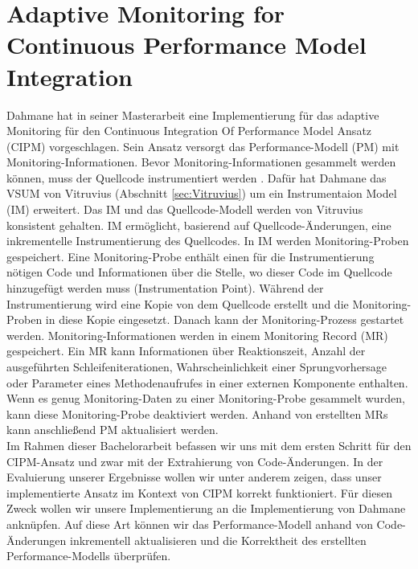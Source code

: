 \section{Adaptive Monitoring for Continuous Performance Model Integration}\label{sec:Adaptive Monitoring for Continuous Performance Model Integration}
Dahmane hat in seiner Masterarbeit \cite{dahmane2019} eine Implementierung für das adaptive Monitoring für den Continuous Integration Of Performance Model Ansatz (CIPM) vorgeschlagen. Sein Ansatz versorgt das Performance-Modell (PM) mit Monitoring-Informationen. Bevor Monitoring-Informationen gesammelt werden können, muss der Quellcode instrumentiert werden \cite{wikiCodeInstrumentierung}. Dafür hat Dahmane das VSUM von Vitruvius (Abschnitt \ref{sec:Vitruvius}) um ein Instrumentaion Model (IM) erweitert. Das IM und das Quellcode-Modell werden von Vitruvius konsistent gehalten. IM ermöglicht, basierend auf Quellcode-Änderungen, eine inkrementelle Instrumentierung des Quellcodes. In IM werden Monitoring-Proben gespeichert. Eine Monitoring-Probe enthält einen für die Instrumentierung nötigen Code und Informationen über die Stelle, wo dieser Code im Quellcode hinzugefügt werden muss (Instrumentation Point). Während der Instrumentierung wird eine Kopie von dem Quellcode erstellt und die Monitoring-Proben in diese Kopie eingesetzt. Danach kann der Monitoring-Prozess gestartet werden. Monitoring-Informationen werden in einem Monitoring Record (MR) gespeichert. Ein MR kann Informationen über Reaktionszeit, Anzahl der ausgeführten Schleifeniterationen, Wahrscheinlichkeit einer Sprungvorhersage oder Parameter eines Methodenaufrufes in einer externen Komponente enthalten. Wenn es genug Monitoring-Daten zu einer Monitoring-Probe gesammelt wurden, kann diese Monitoring-Probe deaktiviert werden. Anhand von erstellten MRs kann anschließend PM aktualisiert werden.
\\   
Im Rahmen dieser Bachelorarbeit befassen wir uns mit dem ersten Schritt für den CIPM-Ansatz und zwar mit der Extrahierung  von Code-Änderungen. In der Evaluierung unserer Ergebnisse wollen wir unter anderem zeigen, dass unser implementierte Ansatz im Kontext von CIPM korrekt funktioniert. Für diesen Zweck wollen wir unsere Implementierung an die Implementierung von Dahmane anknüpfen. Auf diese Art können wir das Performance-Modell anhand von Code-Änderungen inkrementell aktualisieren und die Korrektheit des erstellten Performance-Modells überprüfen. 
 



